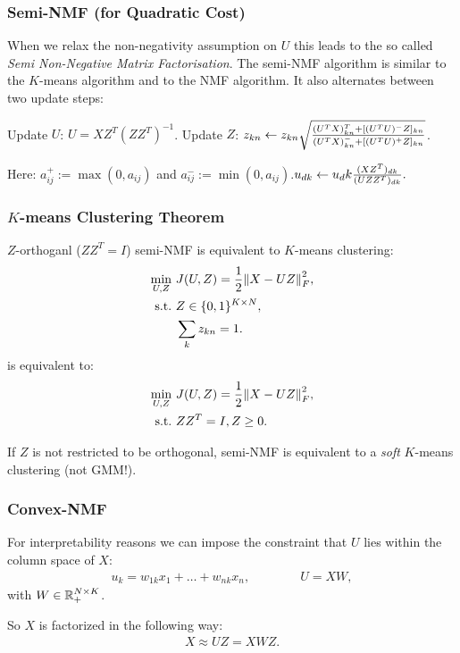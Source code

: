 \subsubsection{Semi-NMF (for Quadratic Cost)}
When we relax the non-negativity assumption on $U$ this leads to the so called
\emph{Semi Non-Negative Matrix Factorisation}. The semi-NMF algorithm is similar to the $K$-means algorithm and to the NMF algorithm. It also alternates between two update steps:
\begin{algorithmic}
\STATE Update $U$: $U=XZ^T (ZZ^T)^{-1}$.
\STATE Update $Z$: $z_{kn} \gets z_{kn} \sqrt{{(U^T X)_{kn}^T +[(U^T U)^- Z]_{kn} \over (U^TX)_{kn}^- + [(U^TU)^+ Z]_{kn}}}$.
\end{algorithmic}
Here: $a_{ij}^+ := \max(0,a_{ij})$ and $a_{ij}^- := \min(0,a_{ij})$.$u_{dk} \gets u_dk {(XZ^T)_{dk}\over (UZZ^T)_{dk}}.$

\subsubsection{$K$-means Clustering Theorem}
$Z$-orthoganl ($ZZ^T = I$) semi-NMF is equivalent to $K$-means clustering:
\begin{align*}
    \min_{U,Z}\ &J(U,Z) ={1\over 2} \norm{X-UZ}_F^2,\\
    \text{s.t.}\ &Z\in \{0,1\}^{K\times N},\\
    &\sum_k z_{kn} = 1.
\end{align*}
is equivalent to:
\begin{align*}
    \min_{U,Z}\ &J(U,Z) ={1\over 2} \norm{X-UZ}_F^2,\\
    \text{s.t.}\ & ZZ^T = I,Z \geq 0.
\end{align*}

If $Z$ is not restricted to be orthogonal, semi-NMF is equivalent to a \emph{soft} $K$-means clustering (not GMM!).

\subsubsection{Convex-NMF}
For interpretability reasons we can impose the constraint that $U$ lies within the column space of $X$:
\begin{align*}
    u_k = w_{1k} x_1 + \ldots + w_{nk} x_n,\qquad \qquad U=XW,
\end{align*}
with $W\in \mathbb{R}_+^{N\times K}$.

So $X$ is factorized in the following way:
\begin{align*}
    X\approx UZ = XWZ.
\end{align*}

